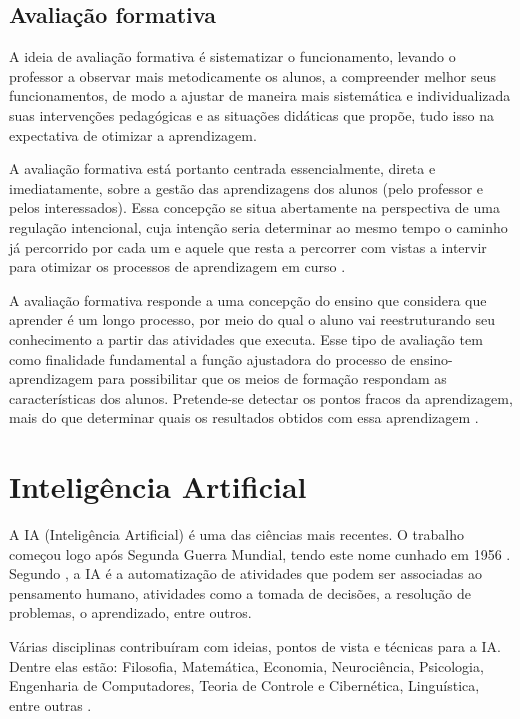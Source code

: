 \documentclass[
	12pt,				%
	openright,			%
	oneside,
	a4paper,			%
	english,			%
	french,				%
	spanish,			%
	brazil,				%
	]{abntex2}
\begin{document}
\subsection{Avaliação formativa}
\label{sec:AvaFor}
A ideia de avaliação formativa é sistematizar o funcionamento, levando o professor a observar mais metodicamente os alunos, a compreender melhor seus funcionamentos, de modo a ajustar de maneira mais sistemática e individualizada suas intervenções pedagógicas e as situações didáticas que propõe, tudo isso na expectativa de otimizar a aprendizagem. 

A avaliação formativa está portanto centrada essencialmente, direta e imediatamente, sobre a gestão das aprendizagens dos alunos (pelo professor e pelos interessados). Essa concepção se situa abertamente na perspectiva de uma regulação intencional, cuja intenção seria determinar ao mesmo tempo o caminho já percorrido por cada um e aquele que resta a percorrer com vistas a intervir para otimizar os processos de aprendizagem em curso \cite{perrenoud1999avaliaccao}.

A avaliação formativa responde a uma concepção do ensino que considera que aprender é um longo processo, por meio do qual o aluno vai reestruturando seu conhecimento a partir das atividades que executa. Esse tipo de avaliação tem como finalidade fundamental a função ajustadora do processo de ensino-aprendizagem para possibilitar que os meios de formação respondam as características dos alunos. Pretende-se detectar os pontos fracos da aprendizagem, mais do que determinar quais os resultados obtidos com essa aprendizagem \cite{jorba2003funccao}.

\section{Inteligência Artificial}
\label{sec:IA}
A IA (Inteligência Artificial) é uma das ciências mais recentes. O trabalho começou logo após Segunda Guerra Mundial, tendo este nome cunhado em 1956 \cite{russell2004inteligencia}. Segundo , a IA é a automatização de atividades que podem ser associadas ao pensamento humano, atividades como a tomada de decisões, a resolução de problemas, o aprendizado, entre outros.

Várias disciplinas contribuíram com ideias, pontos de vista e técnicas para a IA. Dentre elas estão: Filosofia, Matemática, Economia, Neurociência, Psicologia, Engenharia de Computadores, Teoria de Controle e Cibernética, Linguística, entre outras \cite{russell2004inteligencia}.
\end{document}
